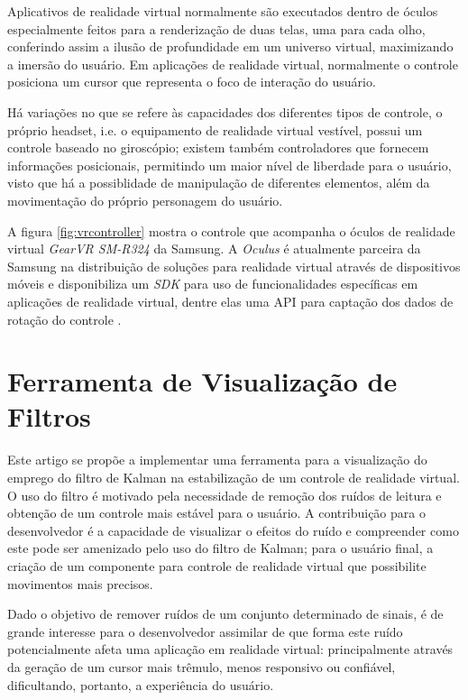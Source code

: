 \documentclass[conference]{IEEEtran}
\begin{document}
Aplicativos de realidade virtual normalmente são executados dentro de óculos especialmente feitos para a renderização de duas telas, uma para cada olho, conferindo assim a ilusão de profundidade em um universo virtual, maximizando a imersão do usuário. Em aplicações de realidade virtual, normalmente o controle posiciona um cursor que representa o foco de interação do usuário.

Há variações no que se refere às capacidades dos diferentes tipos de controle, o próprio headset, i.e. o equipamento de realidade virtual vestível, possui um controle baseado no giroscópio; existem também controladores que fornecem informações posicionais, permitindo um maior nível de liberdade para o usuário, visto que há a possiblidade de manipulação de diferentes elementos, além da movimentação do próprio personagem do usuário.

A figura \ref{fig:vrcontroller} mostra o controle que acompanha o óculos de realidade virtual \textit{GearVR SM-R324} da Samsung. A \textit{Oculus} é atualmente parceira da Samsung na distribuição de soluções para realidade virtual através de dispositivos móveis e disponibiliza um \textit{SDK} para uso de funcionalidades específicas em aplicações de realidade virtual, dentre elas uma API para captação dos dados de rotação do controle \cite{gearvrinputdocs}.





\section{Ferramenta de Visualização de Filtros} \label{sec:viztool}

Este artigo se propõe a implementar uma ferramenta para a visualização do emprego do filtro de Kalman na estabilização de um controle de realidade virtual. O uso do filtro é motivado pela necessidade de remoção dos ruídos de leitura e obtenção de um controle mais estável para o usuário. A contribuição para o desenvolvedor é a capacidade de visualizar o efeitos do ruído e compreender como este pode ser amenizado pelo uso do filtro de Kalman; para o usuário final, a criação de um componente para controle de realidade virtual que possibilite movimentos mais precisos.


Dado o objetivo de remover ruídos de um conjunto determinado de sinais, é de grande interesse para o desenvolvedor assimilar de que forma este ruído potencialmente afeta uma aplicação em realidade virtual: principalmente através da geração de um cursor mais trêmulo, menos responsivo ou confiável, dificultando, portanto, a experiência do usuário.
\end{document}
